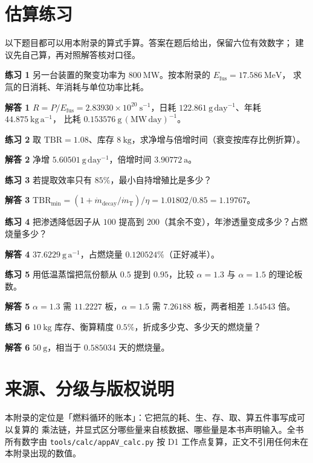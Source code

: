 \section{估算练习}
\label{sec:app-av-problems}

以下题目都可以用本附录的算式手算。答案在题后给出，保留六位有效数字；
建议先自己算，再对照解答核对口径。

\textbf{练习 1}
另一台装置的聚变功率为 $800\ \mathrm{MW}$。按本附录的 $E_\mathrm{fus}=17.586\ \mathrm{MeV}$，
求氚的日消耗、年消耗与单位功率比耗。

\textbf{解答 1}
$R=P/E_\mathrm{fus}=2.83930\times10^{20}\ \mathrm{s^{-1}}$，日耗
$122.861\ \mathrm{g\,day^{-1}}$、年耗 $44.875\ \mathrm{kg\,a^{-1}}$，
比耗 $0.153576\ \mathrm{g\,(MW\,day)^{-1}}$。

\textbf{练习 2}
取 $\mathrm{TBR}=1.08$、库存 $8\ \mathrm{kg}$，求净增与倍增时间（衰变按库存比例折算）。

\textbf{解答 2}
净增 $5.60501\ \mathrm{g\,day^{-1}}$，倍增时间 $3.90772\ \mathrm{a}$。

\textbf{练习 3}
若提取效率只有 $85\%$，最小自持增殖比是多少？

\textbf{解答 3}
$\mathrm{TBR}_\mathrm{min}=(1+\dot m_\mathrm{decay}/\dot m_\mathrm{T})/\eta
=1.01802/0.85=1.19767$。

\textbf{练习 4}
把渗透降低因子从 $100$ 提高到 $200$（其余不变），年渗透量变成多少？占燃烧量多少？

\textbf{解答 4}
$37.6229\ \mathrm{g\,a^{-1}}$，占燃烧量 $0.120524\%$（正好减半）。

\textbf{练习 5}
用低温蒸馏把氚份额从 $0.5$ 提到 $0.95$，比较 $\alpha=1.3$ 与 $\alpha=1.5$ 的理论板数。

\textbf{解答 5}
$\alpha=1.3$ 需 $11.2227$ 板，$\alpha=1.5$ 需 $7.26188$ 板，两者相差 $1.54543$ 倍。

\textbf{练习 6}
$10\ \mathrm{kg}$ 库存、衡算精度 $0.5\%$，折成多少克、多少天的燃烧量？

\textbf{解答 6}
$50\ \mathrm{g}$，相当于 $0.585034$ 天的燃烧量。

\section{来源、分级与版权说明}
\label{sec:app-av-source}

\begingroup\small
本附录的定位是「燃料循环的账本」：它把氚的耗、生、存、取、算五件事写成可以复算的
乘法链，并显式区分哪些量来自核数据、哪些量是本书声明输入。全书所有数字由
\texttt{tools/\allowbreak{}calc/\allowbreak{}appAV\_calc.py} 按 D1 工作点复算，正文不引用任何未在本附录出现的数值。

